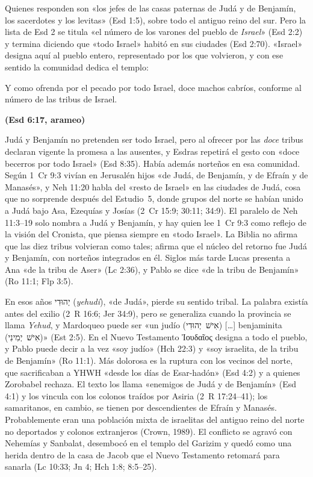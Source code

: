 \documentclass[11pt,letterpaper]{article}
\newcommand{\heb}[1]{\mbox{\foreignlanguage{hebrew}{#1}}}
\newcommand{\grc}[1]{\foreignlanguage{ancientgreek}{#1}}
\newcommand{\hebverso}[1]{\par\needspace{7\baselineskip}\smallskip{\centering\begin{otherlanguage}{hebrew}\large #1\end{otherlanguage}\par}\smallskip}
\newcommand{\fuente}[1]{\par\hfill{\upshape\bfseries\small\textcolor{ladrillo}{#1}}}
\begin{document}
Quienes responden son «los jefes de las casas paternas de Judá y de Benjamín, los sacerdotes y los levitas» (Esd 1:5), sobre todo el antiguo reino del sur. Pero la lista de Esd 2 se titula «el número de los varones del pueblo de \emph{Israel}» (Esd 2:2) y termina diciendo que «todo Israel» habitó en sus ciudades (Esd 2:70). «Israel» designa aquí al pueblo entero, representado por los que volvieron, y con ese sentido la comunidad dedica el templo:
\hebverso{וצפירי עזין לחטאה על כל ישראל תרי עשר למנין שבטי ישראל}
\begin{cita}Y como ofrenda por el pecado por todo Israel, doce machos cabríos, conforme al número de las tribus de Israel.\fuente{(Esd 6:17, arameo)}\end{cita}
Judá y Benjamín no pretenden ser todo Israel, pero al ofrecer por las \emph{doce} tribus declaran vigente la promesa a las ausentes, y Esdras repetirá el gesto con «doce becerros por todo Israel» (Esd 8:35). Había además norteños en esa comunidad. Según 1~Cr 9:3 vivían en Jerusalén hijos «de Judá, de Benjamín, y de Efraín y de Manasés», y Neh 11:20 habla del «resto de Israel» en las ciudades de Judá, cosa que no sorprende después del Estudio~5, donde grupos del norte se habían unido a Judá bajo Asa, Ezequías y Josías (2~Cr 15:9; 30:11; 34:9). El paralelo de Neh 11:3--19 solo nombra a Judá y Benjamín, y hay quien lee 1~Cr 9:3 como reflejo de la visión del Cronista, que piensa siempre en «todo Israel». La Biblia no afirma que las diez tribus volvieran como tales; afirma que el núcleo del retorno fue Judá y Benjamín, con norteños integrados en él. Siglos más tarde Lucas presenta a Ana «de la tribu de Aser» (Lc 2:36), y Pablo se dice «de la tribu de Benjamín» (Ro 11:1; Flp 3:5).

En esos años \heb{יְהוּדִי} (\emph{yehudí}), «de Judá», pierde su sentido tribal. La palabra existía antes del exilio (2~R 16:6; Jer 34:9), pero se generaliza cuando la provincia se llama \emph{Yehud}, y Mardoqueo puede ser «un judío (\heb{אִישׁ יְהוּדִי}) [\ldots] benjaminita (\heb{אִישׁ יְמִינִי})» (Est 2:5). En el Nuevo Testamento \grc{Ἰουδαῖος} designa a todo el pueblo, y Pablo puede decir a la vez «soy judío» (Hch 22:3) y «soy israelita, de la tribu de Benjamín» (Ro 11:1). Más dolorosa es la ruptura con los vecinos del norte, que sacrificaban a YHWH «desde los días de Esar-hadón» (Esd 4:2) y a quienes Zorobabel rechaza. El texto los llama «enemigos de Judá y de Benjamín» (Esd 4:1) y los vincula con los colonos traídos por Asiria (2~R 17:24--41); los samaritanos, en cambio, se tienen por descendientes de Efraín y Manasés. Probablemente eran una población mixta de israelitas del antiguo reino del norte no deportados y colonos extranjeros (Crown, 1989). El conflicto se agravó con Nehemías y Sanbalat, desembocó en el templo del Garizim y quedó como una herida dentro de la casa de Jacob que el Nuevo Testamento retomará para sanarla (Lc 10:33; Jn 4; Hch 1:8; 8:5--25).
\end{document}
